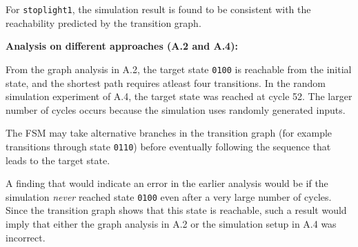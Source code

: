 \documentclass[10pt]{article}
\begin{document}
For \texttt{stoplight1}, the simulation result is found to be consistent with the reachability predicted by the transition graph.

\vspace{0.3cm}
\noindent
\textbf{Analysis on different approaches (A.2 and A.4):}

\noindent
From the graph analysis in A.2, the target state \texttt{0100} is reachable from the initial state, and the shortest path requires atleast four transitions. In the random simulation experiment of A.4, the target state was reached at cycle 52. The larger number of cycles occurs because the simulation uses randomly generated inputs. 

The FSM may take alternative branches in the transition graph (for example transitions through state \texttt{0110}) before eventually following the sequence that leads to the target state.

A finding that would indicate an error in the earlier analysis would be if the simulation \emph{never} reached state \texttt{0100} even after a very large number of cycles. Since the transition graph shows that this state is reachable, such a result would imply that either the graph analysis in A.2 or the simulation setup in A.4 was incorrect.

\end{document}

